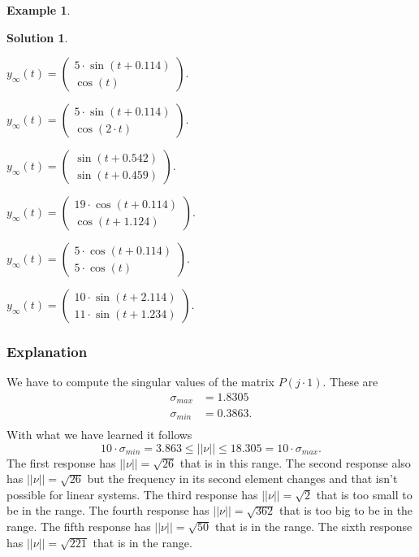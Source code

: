\documentclass[a4paper,12 pt]{article}
\numberwithin{equation}{section}
\theoremstyle{definition}
\newtheorem{bsp}{Example}
\theoremstyle{remark}
\theoremstyle{definition}
\newtheorem*{lsg}{Solution}
\theoremstyle{definition}
\theoremstyle{definition}
\theoremstyle{remark}
\newcommand{\cmark}{\ding{51}}%
\newcommand{\done}{\rlap{$\square$}{\raisebox{2pt}{\large\hspace{1pt}\cmark}}%
\hspace{-2.5pt}}
\begin{document}
\begin{bsp}
\newpage
\begin{lsg}
\
 \begin{todolist}
  \item [\done] $y_\infty(t)=\begin{pmatrix} 
5\cdot \sin(t+0.114)\\
\cos(t)
\end{pmatrix}$.
\item $y_\infty(t)=\begin{pmatrix} 
5\cdot \sin(t+0.114)\\
\cos(2\cdot t)
\end{pmatrix}$.
\item $y_\infty(t)=\begin{pmatrix} 
 \sin(t+0.542)\\
\sin(t+0.459)
\end{pmatrix}$.
\item  $y_\infty(t)=\begin{pmatrix} 
19\cdot \cos(t+0.114)\\
\cos(t+1.124)
\end{pmatrix}$.
\item [\done]$y_\infty(t)=\begin{pmatrix} 
5\cdot \cos(t+0.114)\\
5\cdot \cos(t)
\end{pmatrix}$.
\item [\done] $y_\infty(t)=\begin{pmatrix} 
10\cdot \sin(t+2.114)\\
11\cdot \sin(t+1.234)
\end{pmatrix}$.
  \end{todolist}
\subsubsection*{Explanation}
We have to compute the singular values of the matrix $P(j\cdot 1)$. These are
\begin{equation*}
\begin{split}
\sigma_{max}&=1.8305\\
\sigma_{min}&=0.3863.\\
\end{split}
\end{equation*}
With what we have learned it follows
\begin{equation*}
10\cdot \sigma_{min}=3.863\leq ||\nu||\leq 18.305=10\cdot \sigma_{max}.
\end{equation*}
The first response has $||\nu||=\sqrt{26}$ that is in this range. The second response also has $||\nu||=\sqrt{26}$ but the frequency in its second element changes and that isn't possible for linear systems. The third response has  $||\nu||=\sqrt{2}$ that is too small to be in the range. The fourth response has  $||\nu||=\sqrt{362}$ that is too big to be in the range. The fifth response has $||\nu||=\sqrt{50}$ that is in the range. The sixth response has $||\nu||=\sqrt{221}$ that is in the range.


\end{lsg}

\end{bsp}
\end{document}
